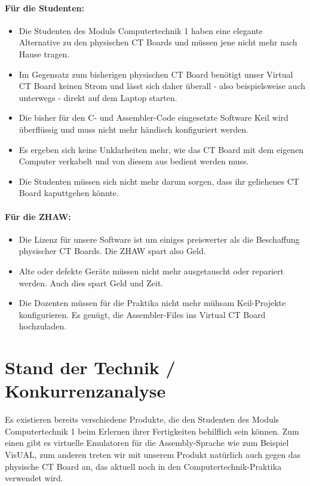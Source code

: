 \documentclass[10pt]{article}
\begin{document}
\paragraph{Für die Studenten:}
\begin{itemize}
\item Die Studenten des Moduls \glqq Computertechnik 1\grqq{} haben eine elegante Alternative zu den physischen CT Boards und müssen jene nicht mehr nach Hause tragen.
\item Im Gegensatz zum bisherigen physischen CT Board benötigt unser \glqq Virtual CT Board\grqq{} keinen Strom und lässt sich daher überall - also beispielsweise auch unterwegs - direkt auf dem Laptop starten.
\item Die bisher für den C- und Assembler-Code eingesetzte Software Keil wird überflüssig und muss nicht mehr händisch konfiguriert werden.
\item Es ergeben sich keine Unklarheiten mehr, wie das CT Board mit dem eigenen Computer verkabelt und von diesem aus bedient werden muss.
\item Die Studenten müssen sich nicht mehr darum sorgen, dass ihr geliehenes CT Board kaputtgehen könnte.
\end{itemize}

\paragraph{Für die ZHAW:}
\begin{itemize}
\item Die Lizenz für unsere Software ist um einiges preiswerter als die Beschaffung physischer CT Boards. Die ZHAW spart also Geld.
\item Alte oder defekte Geräte müssen nicht mehr ausgetauscht oder repariert werden. Auch dies spart Geld und Zeit.
\item Die Dozenten müssen für die Praktika nicht mehr mühsam Keil-Projekte konfigurieren. Es genügt, die Assembler-Files ins \glqq Virtual CT Board\grqq{} hochzuladen.
\end{itemize}

\section{Stand der Technik / Konkurrenzanalyse}

Es existieren bereits verschiedene Produkte, die den Studenten des Moduls \glqq Computertechnik 1\grqq{} beim Erlernen ihrer Fertigkeiten behilflich sein können. Zum einen gibt es virtuelle Emulatoren für die Assembly-Sprache wie zum Beispiel VisUAL, zum anderen treten wir mit unserem Produkt natürlich auch gegen das physische CT Board an, das aktuell noch in den \glqq Computertechnik\grqq-Praktika verwendet wird.
\end{document}
